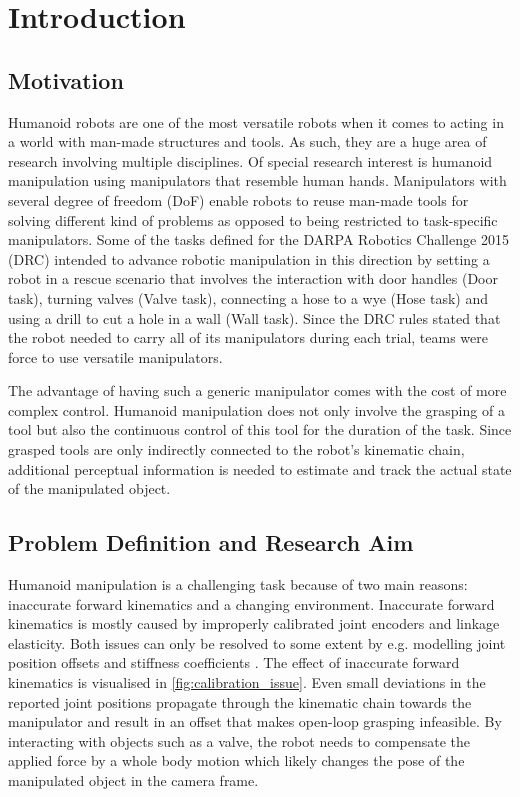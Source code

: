 \chapter{Introduction}

\section{Motivation}

Humanoid robots are one of the most versatile robots when it comes to acting in a world with man-made structures and tools. As such, they are a huge area of research involving multiple disciplines. Of special research interest is humanoid manipulation using manipulators that resemble human hands. Manipulators with several degree of freedom (DoF) enable robots to reuse man-made tools for solving different kind of problems as opposed to being restricted to task-specific manipulators. Some of the tasks defined for the DARPA Robotics Challenge 2015 (DRC) \cite{DRC2013} intended to advance robotic manipulation in this direction by setting a robot in a rescue scenario that involves the interaction with door handles (Door task), turning valves (Valve task), connecting a hose to a wye (Hose task) and using a drill to cut a hole in a wall (Wall task). Since the DRC rules stated that the robot needed to carry all of its manipulators during each trial, teams were force to use versatile manipulators.

The advantage of having such a generic manipulator comes with the cost of more complex control. Humanoid manipulation does not only involve the grasping of a tool but also the continuous control of this tool for the duration of the task. Since grasped tools are only indirectly connected to the robot's kinematic chain, additional perceptual information is needed to estimate and track the actual state of the manipulated object.


\section{Problem Definition and Research Aim}

Humanoid manipulation is a challenging task because of two main reasons: inaccurate forward kinematics and a changing environment.
Inaccurate forward kinematics is mostly caused by improperly calibrated joint encoders and linkage elasticity. Both issues can only be resolved to some extent by e.g. modelling joint position offsets \cite{Fallon2015} and stiffness coefficients \cite{Johnson2015}. The effect of inaccurate forward kinematics is visualised in \cref{fig:calibration_issue}. Even small deviations in the reported joint positions propagate through the kinematic chain towards the manipulator and result in an offset that makes open-loop grasping infeasible.
By interacting with objects such as a valve, the robot needs to compensate the applied force by a whole body motion which likely changes the pose of the manipulated object in the camera frame.

